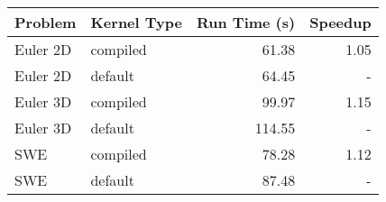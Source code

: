 \begin{tabular}{llrr}
\toprule
Problem & Kernel Type & Run Time (s) & Speedup \\
\midrule
 Euler 2D & compiled & 61.38 & 1.05 \\
 Euler 2D & default & 64.45 & - \\
 Euler 3D & compiled & 99.97 & 1.15 \\
 Euler 3D & default & 114.55 & - \\
 SWE & compiled & 78.28 & 1.12 \\
 SWE & default & 87.48 & - \\
\bottomrule
\end{tabular}
